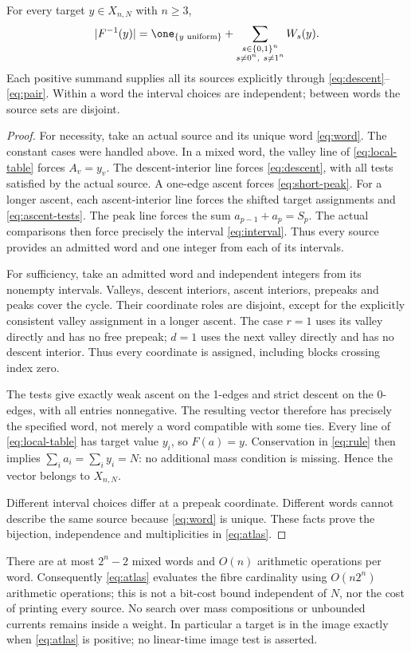 \begin{theorem}\label{thm:atlas}
For every target $y\in X_{n,N}$ with $n\ge3$,
\begin{equation}\label{eq:atlas}
 |F^{-1}(y)|=
 \one_{\{y\text{ uniform}\}}+
 \sum_{\substack{s\in\{0,1\}^n\\s\ne0^n,\ s\ne1^n}}W_s(y).
\end{equation}
Each positive summand supplies all its sources explicitly through
\eqref{eq:descent}--\eqref{eq:pair}. Within a word the interval choices are
independent; between words the source sets are disjoint.
\end{theorem}
\begin{proof}
For necessity, take an actual source and its unique word
\eqref{eq:word}. The constant cases were handled above. In a mixed word,
the valley line of \eqref{eq:local-table} forces $A_v=y_v$. The
descent-interior line forces \eqref{eq:descent}, with all tests satisfied
by the actual source. A one-edge ascent forces \eqref{eq:short-peak}.
For a longer ascent, each ascent-interior line forces the shifted target
assignments and \eqref{eq:ascent-tests}. The peak line forces the sum
$a_{p-1}+a_p=S_p$. The actual comparisons then force precisely the
interval \eqref{eq:interval}. Thus every source provides an admitted word
and one integer from each of its intervals.

For sufficiency, take an admitted word and independent integers from its
nonempty intervals. Valleys, descent interiors, ascent interiors, prepeaks
and peaks cover the cycle. Their coordinate roles are disjoint, except
for the explicitly consistent valley assignment in a longer ascent.
The case $r=1$ uses its valley directly and has no free prepeak; $d=1$
uses the next valley directly and has no descent interior.
Thus every coordinate is assigned, including blocks crossing index zero.

The tests give exactly weak ascent on the 1-edges and strict descent on
the 0-edges, with all entries nonnegative. The resulting vector therefore
has precisely the specified word, not merely a word compatible with some
ties. Every line of \eqref{eq:local-table} has target value $y_i$, so
$F(a)=y$. Conservation in \eqref{eq:rule} then implies
$\sum_i a_i=\sum_i y_i=N$: no additional mass condition is missing.
Hence the vector belongs to $X_{n,N}$.

Different interval choices differ at a prepeak coordinate. Different
words cannot describe the same source because \eqref{eq:word} is unique.
These facts prove the bijection, independence and multiplicities
in \eqref{eq:atlas}.
\end{proof}

There are at most $2^n-2$ mixed words and $O(n)$ arithmetic operations per
word. Consequently \eqref{eq:atlas} evaluates the fibre cardinality using
$O(n2^n)$ arithmetic operations; this is not a bit-cost bound independent
of $N$, nor the cost of printing every source. No search over mass
compositions or unbounded currents remains inside a weight.
In particular a target is in the image exactly when \eqref{eq:atlas}
is positive; no linear-time image test is asserted.

